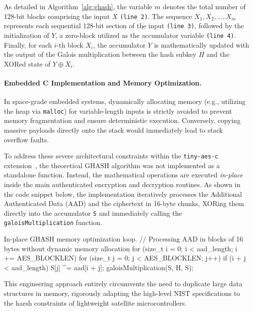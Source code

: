 \documentclass[11pt,a4paper]{report}
\begin{document}
As detailed in Algorithm~\ref{alg:ghash}, the variable $m$ denotes the total number of 128-bit blocks comprising the input $X$ \texttt{(line 2)}. 
The sequence $X_1, X_2, \dots, X_m$ represents each sequential 128-bit section of the input \texttt{(line 3)}, 
followed by the initialization of $Y$, a zero-block utilized as the accumulator variable \texttt{(line 4)}. 
Finally, for each $i$-th block $X_i$, the accumulator $Y$ is mathematically updated with the output of the Galois multiplication between the hash subkey $H$ and the XORed state of $Y \oplus X_i$.

\paragraph{Embedded C Implementation and Memory Optimization.}
In space-grade embedded systems, dynamically allocating memory (e.g., utilizing the heap via \texttt{malloc}) for variable-length inputs is strictly avoided to prevent memory fragmentation and ensure deterministic execution. 
Conversely, copying massive payloads directly onto the stack would immediately lead to stack overflow faults.

To address these severe architectural constraints within the \texttt{tiny-aes-c} extension~\cite{tinyAES}, the theoretical $\text{GHASH}$ algorithm was not implemented as a standalone function. 
Instead, the mathematical operations are executed \textit{in-place} inside the main authenticated encryption and decryption routines. 
As shown in the code snippet below, the implementation iteratively processes the Additional Authenticated Data (AAD) and the ciphertext in 16-byte chunks, XORing them directly into the accumulator \texttt{S} and immediately calling the \texttt{galoisMultiplication} function. 

\begin{clisting}[label={lst:ghash_inline}]{In-place GHASH memory optimization loop.}
// Processing AAD in blocks of 16 bytes without dynamic memory allocation
for (size_t i = 0; i < aad_length; i += AES_BLOCKLEN) {
    for (size_t j = 0; j < AES_BLOCKLEN; j++) {
        if (i + j < aad_length) {
            S[j] ^= aad[i + j];
        }
    }
    galoisMultiplication(S, H, S);
}
\end{clisting}

This engineering approach entirely circumvents the need to duplicate large data structures in memory, rigorously adapting the high-level NIST specifications to the harsh constraints of lightweight satellite microcontrollers.
\end{document}
